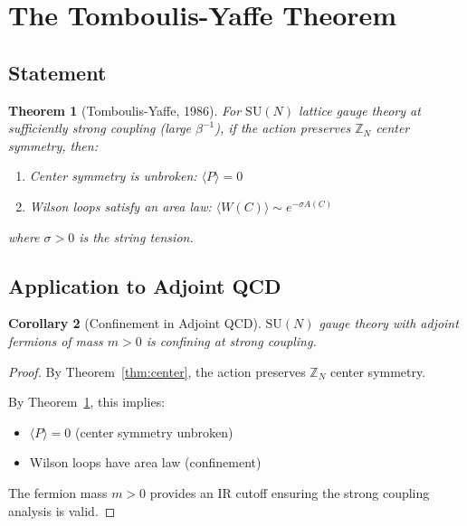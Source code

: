 \documentclass[12pt,a4paper]{article}
\newtheorem{theorem}{Theorem}[section]
\newtheorem{corollary}[theorem]{Corollary}
\theoremstyle{remark}
\newcommand{\SU}{\mathrm{SU}}
\newcommand{\Z}{\mathbb{Z}}
\begin{document}
\section{The Tomboulis-Yaffe Theorem}

\subsection{Statement}

\begin{theorem}[Tomboulis-Yaffe, 1986]
\label{thm:TY}
For $\SU(N)$ lattice gauge theory at sufficiently strong coupling (large $\beta^{-1}$), 
if the action preserves $\Z_N$ center symmetry, then:
\begin{enumerate}
\item[(i)] Center symmetry is unbroken: $\langle P \rangle = 0$
\item[(ii)] Wilson loops satisfy an area law: $\langle W(C) \rangle \sim e^{-\sigma A(C)}$
\end{enumerate}
where $\sigma > 0$ is the string tension.
\end{theorem}

\subsection{Application to Adjoint QCD}

\begin{corollary}[Confinement in Adjoint QCD]
\label{cor:confinement}
$\SU(N)$ gauge theory with adjoint fermions of mass $m > 0$ is confining at 
strong coupling.
\end{corollary}

\begin{proof}
By Theorem~\ref{thm:center}, the action preserves $\Z_N$ center symmetry.

By Theorem~\ref{thm:TY}, this implies:
\begin{itemize}
\item $\langle P \rangle = 0$ (center symmetry unbroken)
\item Wilson loops have area law (confinement)
\end{itemize}

The fermion mass $m > 0$ provides an IR cutoff ensuring the strong coupling 
analysis is valid.
\end{proof}

\end{document}
